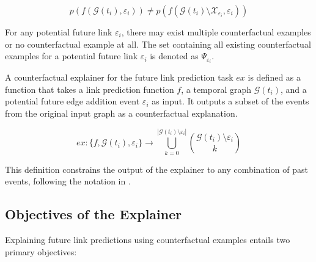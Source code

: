 \begin{equation}
    \label{e_CFExplanation}
    p(f(\mathcal{G}(t_i), \varepsilon_{i})) \neq p(f(\mathcal{G}(t_i) \setminus \mathcal{X}_{\varepsilon_i}, \varepsilon_{i}))
\end{equation}

For any potential future link $\varepsilon_{i}$, there may exist multiple counterfactual examples or no counterfactual example at all. The set containing all existing counterfactual examples for a potential future link $\varepsilon_{i}$ is denoted as $\Psi_{\varepsilon_i}$.

A counterfactual explainer for the future link prediction task $ex$ is defined as a function that takes a link prediction function $f$, a temporal graph $\mathcal{G}(t_i)$, and a potential future edge addition event $\varepsilon_i$ as input. It outputs a subset of the events from the original input graph as a counterfactual explanation.

\begin{equation}
    \label{e_Explainer}
    ex: \{f, \mathcal{G}(t_i), \varepsilon_i\} \rightarrow \bigcup_{k = 0}^{|\mathcal{G}(t_i) \setminus \varepsilon_i|} {\mathcal{G}(t_i) \setminus \varepsilon_i \choose k}
\end{equation}

This definition constrains the output of the explainer to any combination of past events, following the notation in \cite{stanley_enumerative_1986}.

\subsection{Objectives of the Explainer}
\label{s_ProblemFormulation_Objectives}

Explaining future link predictions using counterfactual examples entails two primary objectives:

